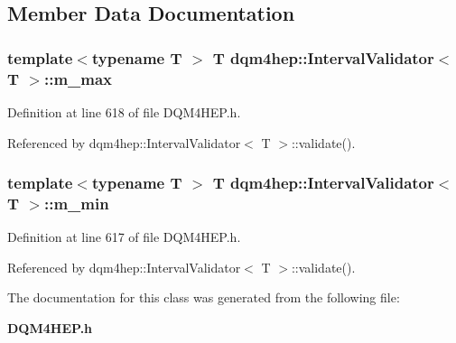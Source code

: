 \subsection{Member Data Documentation}
\subsubsection[{m\+\_\+max}]{\setlength{\rightskip}{0pt plus 5cm}template$<$typename T $>$ T {\bf dqm4hep\+::\+Interval\+Validator}$<$ T $>$\+::m\+\_\+max\hspace{0.3cm}{\ttfamily [private]}}\label{classdqm4hep_1_1IntervalValidator_a7bb3ba71fe1774451d871379572b5cf3}


Definition at line 618 of file D\+Q\+M4\+H\+E\+P.\+h.



Referenced by dqm4hep\+::\+Interval\+Validator$<$ T $>$\+::validate().

\subsubsection[{m\+\_\+min}]{\setlength{\rightskip}{0pt plus 5cm}template$<$typename T $>$ T {\bf dqm4hep\+::\+Interval\+Validator}$<$ T $>$\+::m\+\_\+min\hspace{0.3cm}{\ttfamily [private]}}\label{classdqm4hep_1_1IntervalValidator_ad927af65b7196ee77914beecaa7a228f}


Definition at line 617 of file D\+Q\+M4\+H\+E\+P.\+h.



Referenced by dqm4hep\+::\+Interval\+Validator$<$ T $>$\+::validate().



The documentation for this class was generated from the following file\+:\begin{DoxyCompactItemize}
\item 
{\bf D\+Q\+M4\+H\+E\+P.\+h}\end{DoxyCompactItemize}
